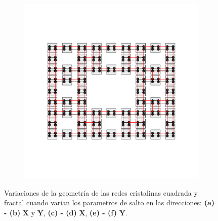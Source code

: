 \begin{figure}[thb!]
\begin{minipage}[h!]{0.9\textwidth}
\begin{subfigure}[b!]{0.2 \textwidth}
         \end{subfigure}\hspace*{-0.5em}
         \begin{subfigure}[b!]{0.2 \textwidth}
             \caption*{}
             \includegraphics[width=\textwidth]{Imagenes/Models/Model_pump/fractal_pump_model_y_16.pdf}
         \end{subfigure}\hspace*{-0.5em}
     \end{minipage} 
    \caption{Variaciones de la geometría de las redes cristalinas cuadrada y fractal cuando varian los parametros de salto en las direcciones: \textbf{(a) - (b)} $\textbf{X}$ y $\textbf{Y}$, \textbf{(c) - (d)} $\textbf{X}$, \textbf{(e) - (f)} $\textbf{Y}$. }
    \label{fig:Model_pump}
\end{figure}